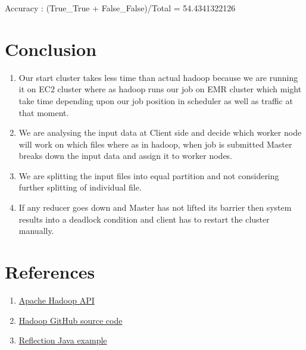 \documentclass{article}
\begin{document}
Accuracy : (True\_True + False\_False)/Total = 54.4341322126

\section{Conclusion}

\begin{enumerate}
    \item Our start cluster takes less time than actual hadoop because we are running it on EC2 cluster where as hadoop runs our job on EMR cluster which might take time depending upon our job position in scheduler as well as traffic at that moment. 
    \item We are analysing the input data at Client side and decide which worker node will work on which files where as in hadoop, when job is submitted Master breaks down the input data and assign it to worker nodes.
    \item We are splitting the input files into equal partition and not considering further splitting of individual file.
    \item If any reducer goes down and Master has not lifted its barrier then system results into a deadlock condition and client has to restart the cluster manually.
\end{enumerate}



\section{References}

\begin{enumerate}
    \item \href{https://hadoop.apache.org/docs/stable/api/}{Apache Hadoop API}
    \item \href{https://github.com/apache/hadoop}{Hadoop GitHub source code}
    \item \href{https://examples.javacodegeeks.com/core-java/reflection/java-reflection-example/}{Reflection Java example}
\end{enumerate}
\end{document}
